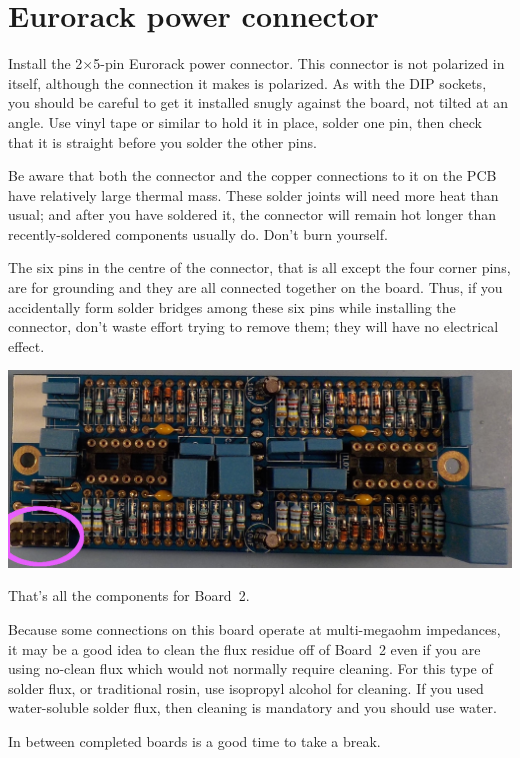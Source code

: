 \section{Eurorack power connector}

Install the 2$\times$5-pin Eurorack power connector.  This connector is not
polarized in itself, although the connection it makes is polarized.  As with
the DIP sockets, you should be careful to get it installed snugly against
the board, not tilted at an angle.  Use vinyl tape or similar to hold it in
place, solder one pin, then check that it is straight before you solder the
other pins.

Be aware that both the connector and the copper connections to it on the PCB
have relatively large thermal mass.  These solder joints will need more
heat than usual; and after you have soldered it, the connector will remain
hot longer than recently-soldered components usually do.  Don't burn
yourself.

The six pins in the centre of the connector, that is all except the four
corner pins, are for grounding and they are all connected together on the
board.  Thus, if you accidentally form solder bridges among these six pins
while installing the connector, don't waste effort trying to remove them;
they will have no electrical effect.

\noindent\includegraphics[width=\linewidth]{powerA.jpg}

That's all the components for Board~2.

Because some connections on this board operate at multi-megaohm impedances,
it may be a good idea to clean the flux residue off of Board~2 even if you
are using no-clean flux which would not normally require cleaning.  For
this type of solder flux, or traditional rosin, use isopropyl alcohol for
cleaning.  If you used water-soluble solder flux, then cleaning is
mandatory and you should use water.

In between completed boards is a good time to take a break.
